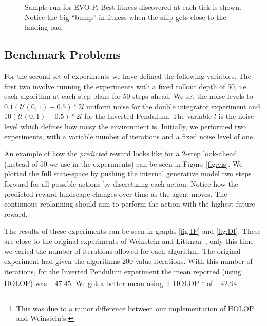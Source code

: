 \documentclass[conference]{IEEEtran}
\begin{document}
\begin{figure}[ht]
\begin{subfigure}{0.49\textwidth}
        \end{subfigure}
       

         \caption{Sample run for EVO-P. Best fitness discovered at each tick is shown. Notice the big ``bump'' in fitness when the ship gets close to the landing pad}
         \label{fig:samples}

\end{figure}

\subsection{Benchmark Problems}


For the second set of experiments we have defined the following variables. The first two involve running the experiments with a fixed rollout depth of 50, i.e. each algorithm at each step plans for 50 steps ahead. We set the noise levels to $0.1 (\mathcal{U}(0,1)-0.5)*2 l$ uniform noise for the double integrator experiment and $10 (\mathcal{U}(0,1)-0.5)*2 l$  for the Inverted Pendulum.  The variable $l$ is the noise level which defines how noisy the environment is. Initially, we performed two experiments, with a variable number of iterations and a fixed noise level of one. 

An example of how the \textit{predicted} reward looks like for a $2$-step look-ahead (instead of $50$ we use in the experiments) can be seen in Figure \ref{fig:vis}. We plotted the full state-space by pushing the internal generative model two steps forward for all possible actions by discretizing each action. Notice how the predicted reward landscape changes over time as the agent moves. The continuous replanning should aim to perform the action with the highest future reward.  



The results of these experiments can be seen in graphs  \ref{fig:IP} and \ref{fig:DI}. These are close to the original experiments of Weinstein and Littman~\cite{weinstein2012bandit}, only this time we varied the number
of iterations allowed for each algorithm. The original experiment had given the algorithms 200 value iterations. With this number of iterations, for the Inverted Pendulum experiment the mean reported (using HOLOP) was $-47.45$. We got a better mean using T-HOLOP
\footnote{This was due to a minor difference between our implementation of HOLOP and Weinstein's.}
 of $-42.94$.
\end{document}
